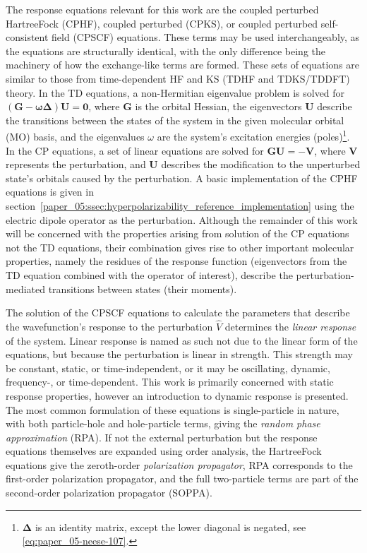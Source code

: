 \documentclass[%
class = book,%
crop = false,%
float = true,%
multi = true,%
preview = false,%
]{standalone}
\let\cite\autocite
\newcommand\hf{Hartree\textendash{}Fock}
\begin{document}
The response equations relevant for this work are the coupled perturbed \hf{} (CPHF), coupled perturbed \ks{} (CPKS), or coupled perturbed self-consistent field (CPSCF) equations. These terms may be used interchangeably, as the equations are structurally identical, with the only difference being the machinery of how the exchange-like terms are formed. These sets of equations are similar to those from time-dependent HF and KS (TDHF and TDKS/TDDFT) theory. In the TD equations, a non-Hermitian eigenvalue problem is solved for \((\mathbf{G} - \mathbf{\omega\Delta})\mathbf{U} = \mathbf{0}\), where \(\mathbf{G}\) is the orbital Hessian, the eigenvectors \(\mathbf{U}\) describe the transitions between the states of the system in the given molecular orbital (MO) basis, and the eigenvalues \(\omega\) are the system's excitation energies (poles)\footnote{\(\mathbf{\Delta}\) is an identity matrix, except the lower diagonal is negated, see \eqref{eq:paper_05-neese-107}.}. In the CP equations, a set of linear equations are solved for \(\mathbf{GU} = -\mathbf{V}\), where \(\mathbf{V}\) represents the perturbation, and \(\mathbf{U}\) describes the modification to the unperturbed state's orbitals caused by the perturbation. A basic implementation of the CPHF equations is given in section~\ref{paper_05:ssec:hyperpolarizability_reference_implementation} using the electric dipole operator as the perturbation. Although the remainder of this work will be concerned with the properties arising from solution of the CP equations not the TD equations, their combination gives rise to other important molecular properties, namely the residues of the response function (eigenvectors from the TD equation combined with the operator of interest), describe the perturbation-mediated transitions between states (their moments).

The solution of the CPSCF equations to calculate the parameters that describe the wavefunction's response to the perturbation \(\hat{V}\) determines the \emph{linear response} of the system. Linear response is named as such not due to the linear form of the equations, but because the perturbation is linear in strength. This strength may be constant, static, or time-independent, or it may be oscillating, dynamic, frequency-, or time-dependent. This work is primarily concerned with static response properties, however an introduction to dynamic response is presented. The most common formulation of these equations is single-particle in nature, with both particle-hole and hole-particle terms, giving the \emph{random phase approximation} (RPA). If not the external perturbation but the response equations themselves are expanded using order analysis, the \hf{} equations give the zeroth-order \emph{polarization propagator}, RPA corresponds to the first-order polarization propagator, and the full two-particle terms are part of the second-order polarization propagator (SOPPA)\cite{ODDERSHEDE198433}.
\end{document}
